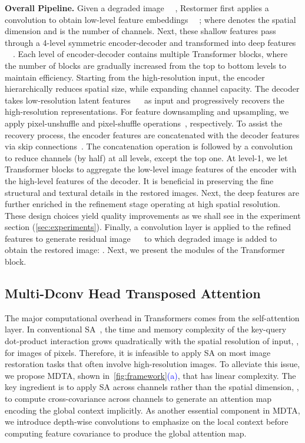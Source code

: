 \documentclass[10pt,twocolumn,letterpaper]{article}
\def\xnet{Restormer\xspace}
\begin{document}
\vspace{0.2em} \noindent \textbf{Overall Pipeline.} 
Given a degraded image ~~, \xnet first applies a convolution to obtain low-level feature embeddings ~~; where  denotes the spatial dimension and  is the number of channels. Next, these shallow features  pass through a 4-level symmetric encoder-decoder and transformed into deep features ~~. 
Each level of encoder-decoder contains multiple Transformer blocks, where the number of blocks are gradually increased from the top to bottom levels to maintain efficiency. 
Starting from the high-resolution input, the encoder hierarchically reduces spatial size, while expanding channel capacity. The decoder takes low-resolution latent features ~~ as input and progressively recovers the high-resolution representations. 
For feature downsampling and upsampling, we apply pixel-unshuffle and pixel-shuffle operations~\cite{shi2016real_pixelshuffle}, respectively. 
To assist {the} recovery process, the encoder features are concatenated with the decoder features via skip connections~\cite{ronneberger2015unet}. 
The concatenation operation is followed by a  convolution to reduce channels (by half) at all levels, except the top one. 
At level-1, we let Transformer blocks to aggregate the low-level image features of the encoder with the high-level features of the decoder. It is beneficial in preserving the fine structural and textural details in the restored images.
Next, the deep features  are further enriched in the refinement stage operating at high spatial resolution.  These design choices yield quality improvements as we shall see in the experiment section (\cref{sec:experiments}). 
Finally, a convolution layer is applied to the refined features to generate residual image ~~ to which degraded image is added to obtain the restored image: . Next, we present the modules of the Transformer block. 

\subsection{Multi-Dconv Head Transposed Attention}\label{sec:MDTA}
The major computational overhead in Transformers comes from the self-attention layer. In conventional SA~\cite{vaswani2017attention,vision_transformer}, the time and memory complexity of the key-query dot-product interaction grows quadratically with the spatial resolution of input, \ie,  for images of  pixels. 
Therefore, it is infeasible to apply SA on most image restoration tasks that often involve high-resolution images. 
To alleviate this issue, we propose MDTA, shown in~\cref{fig:framework}\textcolor{blue}{(a)}, that has linear complexity. 
The key ingredient is to apply SA across channels rather than the spatial dimension, \ie, to compute cross-covariance across channels to generate {an} attention map encoding the global context implicitly. 
As another essential component in MDTA, we introduce {depth-wise convolutions} to emphasize on {the} local context before computing feature covariance to produce the global attention map. 
\end{document}
